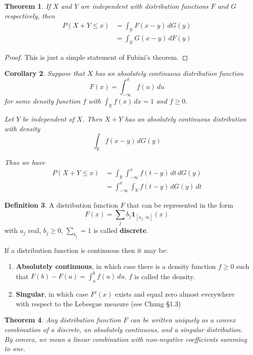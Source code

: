 \documentclass[10pt, oneside, reqno]{amsart}
\theoremstyle{plain}%
\newtheorem{thm}{Theorem}[section]
\newtheorem{cor}[thm]{Corollary}
\theoremstyle{definition}
\newtheorem{defn}[thm]{Definition}
\theoremstyle{remark}
\newcommand{\R}{\mathbb{R}}
\begin{document}
\begin{thm}
	If $X$ and $Y$ are independent with distribution functions $F$ and $G$ respectively, then 
	\begin{align*}
		P(X+Y \leq x) &= \int_\R F(x-y) \, dG(y) \\
				  	  &= \int_\R G(x-y) \, dF(y)
	\end{align*}
\end{thm}
\begin{proof}
	This is just a simple statement of Fubini's theorem.
\end{proof}

\begin{cor}
	Suppose that $X$ has an absolutely continuous distribution function \[
		F(x) = \int_{-\infty}^x f(u) \, du
	\] for some density function $f$ with $\int_\R f(x) \, dx = 1$ and $f \geq 0$.  
	
	Let $Y$ be independent of $X$.  Then $X+Y$ has an absolutely continuous distribution with density \[
		\int_\R f(x-y) \, dG(y)
	\]
	
	Thus we have
	\begin{align*}
		P(X+Y \leq x)  	&= \int_\R \int_{-\infty}^x f(t-y) \, dt \, dG(y) \\
						&= \int_{-\infty}^x \int_\R f(t-y) \, dG(y) \, dt
	\end{align*}
\end{cor}

\begin{defn}
	A distribution function $F$ that can be represented in the form \[
		F(x) = \sum_j b_j \mathbf{1}_{[a_j, \infty]}(x)
	\] with $a_j$ real, $b_j \geq 0$, $\sum_{b_j} = 1$ is called \textbf{discrete}.
	
\end{defn}

If a distribution function is continuous then it may be:
\begin{enumerate}
	\item \textbf{Absolutely continuous}, in which case there is a density function $f \geq 0$ such that $F(b) - F(a) = \int_a^b f(u)\, du$.  $f$ is called the density.
	\item \textbf{Singular}, in which case $F'(x)$ exists and equal zero almost everywhere with respect to the Lebesgue measure (see Chung \S1.3)
\end{enumerate}

\begin{thm}
	Any distribution function $F$ can be written uniquely as a convex combination of a discrete, an absolutely continuous, and a singular distribution.  By convex, we mean a linear combination with non-negative coefficients summing to one.   
\end{thm}
\end{document}
